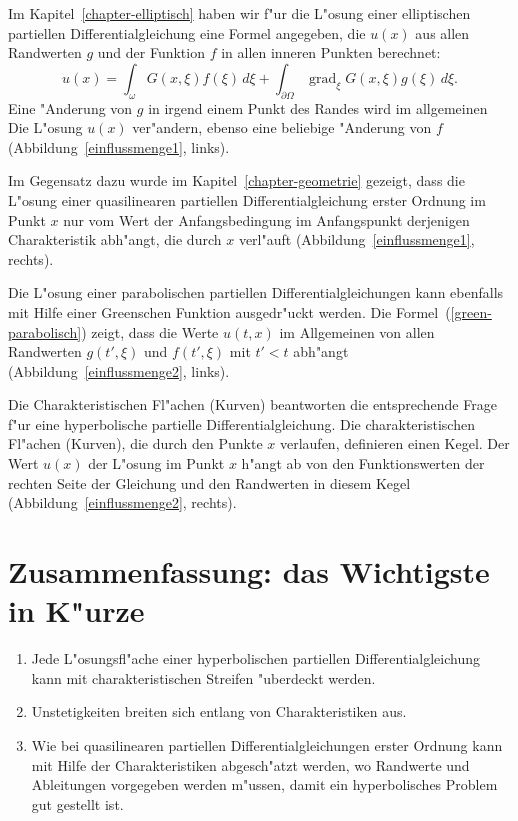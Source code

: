 Im Kapitel~\ref{chapter-elliptisch} haben wir f"ur die L"osung einer
elliptischen partiellen Differentialgleichung eine Formel angegeben,
die $u(x)$ aus allen Randwerten $g$ und der Funktion $f$ in allen 
inneren Punkten berechnet:
\[
u(x)
=
\int_\omega G(x,\xi)f(\xi)\,d\xi
+
\int_{\partial\Omega} \operatorname{grad}_\xi G(x,\xi)g(\xi)\,d\xi.
\]
Eine "Anderung von $g$ in irgend einem Punkt des Randes wird im allgemeinen
Die L"osung $u(x)$ ver"andern, ebenso eine beliebige "Anderung von $f$
(Abbildung~\ref{einflussmenge1}, links).

Im Gegensatz dazu wurde im Kapitel~\ref{chapter-geometrie} gezeigt, 
dass die L"osung einer quasilinearen partiellen Differentialgleichung
erster Ordnung im Punkt $x$ nur vom Wert der Anfangsbedingung im Anfangspunkt
derjenigen Charakteristik abh"angt, die durch $x$ verl"auft
(Abbildung~\ref{einflussmenge1}, rechts).

Die L"osung einer parabolischen partiellen Differentialgleichungen 
kann ebenfalls mit Hilfe einer Greenschen Funktion ausgedr"uckt werden.
Die Formel~(\ref{green-parabolisch}) zeigt, dass die Werte $u(t,x)$
im Allgemeinen von allen Randwerten $g(t',\xi)$ und $f(t',\xi)$
mit $t'<t$ abh"angt (Abbildung~\ref{einflussmenge2}, links).

Die Charakteristischen Fl"achen (Kurven) beantworten die entsprechende
Frage f"ur eine hyperbolische partielle Differentialgleichung.
Die charakteristischen Fl"achen (Kurven), die durch den Punkte $x$ verlaufen,
definieren einen Kegel.
Der Wert $u(x)$ der L"osung im Punkt $x$ h"angt ab von den
Funktionswerten der rechten Seite der Gleichung und den Randwerten
in diesem Kegel
(Abbildung~\ref{einflussmenge2}, rechts).

\section{Zusammenfassung: das Wichtigste in K"urze}
\begin{enumerate}
\item Jede L"osungsfl"ache einer hyperbolischen partiellen Differentialgleichung
kann mit charakteristischen Streifen "uberdeckt werden.
\item Unstetigkeiten breiten sich entlang von Charakteristiken aus.
\item Wie bei quasilinearen partiellen Differentialgleichungen erster
Ordnung kann mit Hilfe der Charakteristiken abgesch"atzt werden, wo
Randwerte und Ableitungen vorgegeben werden m"ussen, damit ein hyperbolisches
Problem gut gestellt ist.
\end{enumerate}

